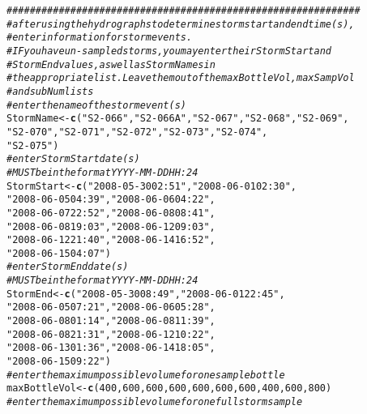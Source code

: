 \documentclass[a4paper,11pt]{article}\usepackage[]{graphicx}\usepackage[]{color}
\makeatletter
\newcommand{\hlnum}[1]{\textcolor[rgb]{0.686,0.059,0.569}{#1}}%
\newcommand{\hlstr}[1]{\textcolor[rgb]{0.192,0.494,0.8}{#1}}%
\newcommand{\hlcom}[1]{\textcolor[rgb]{0.678,0.584,0.686}{\textit{#1}}}%
\newcommand{\hlstd}[1]{\textcolor[rgb]{0.345,0.345,0.345}{#1}}%
\newcommand{\hlkwb}[1]{\textcolor[rgb]{0.69,0.353,0.396}{#1}}%
\newcommand{\hlkwd}[1]{\textcolor[rgb]{0.737,0.353,0.396}{\textbf{#1}}}%
\newenvironment{kframe}{%
 \def\at@end@of@kframe{}%
 \ifinner\ifhmode%
  \def\at@end@of@kframe{\end{minipage}}%
  \begin{minipage}{\columnwidth}%
 \fi\fi%
 \def\FrameCommand##1{\hskip\@totalleftmargin \hskip-\fboxsep
 \colorbox{shadecolor}{##1}\hskip-\fboxsep
     \hskip-\linewidth \hskip-\@totalleftmargin \hskip\columnwidth}%
 \MakeFramed {\advance\hsize-\width
   \@totalleftmargin\z@ \linewidth\hsize
   \@setminipage}}%
 {\par\unskip\endMakeFramed%
 \at@end@of@kframe}
\newenvironment{knitrout}{}{} %
\makeatother
\begin{document}
\begin{knitrout}
\color{fgcolor}\begin{kframe}
\begin{alltt}
\hlcom{#############################################################}
\hlcom{# after using the hydrographs to determine storm start and end time(s), }
\hlcom{# enter information for storm events.}
\hlcom{# IF you have un-sampled storms, you may enter their StormStart and  }
\hlcom{# StormEnd values, as well as StormNames in }
\hlcom{# the appropriate list. Leave them out of the maxBottleVol, maxSampVol  }
\hlcom{# and subNum lists}
\hlcom{# enter the name of the storm event(s)}
\hlstd{StormName} \hlkwb{<-} \hlkwd{c}\hlstd{(}\hlstr{"S2-066"}\hlstd{,}\hlstr{"S2-066A"}\hlstd{,}\hlstr{"S2-067"}\hlstd{,}\hlstr{"S2-068"}\hlstd{,}\hlstr{"S2-069"}\hlstd{,}
               \hlstr{"S2-070"}\hlstd{,}\hlstr{"S2-071"}\hlstd{,}\hlstr{"S2-072"}\hlstd{,}\hlstr{"S2-073"}\hlstd{,}\hlstr{"S2-074"}\hlstd{,}
               \hlstr{"S2-075"}\hlstd{)}
\hlcom{# enter Storm Start date(s)}
\hlcom{# MUST be in the format YYYY-MM-DD HH:24}
\hlstd{StormStart} \hlkwb{<-} \hlkwd{c}\hlstd{(}\hlstr{"2008-05-30 02:51"}\hlstd{,}\hlstr{"2008-06-01 02:30"}\hlstd{,}
                \hlstr{"2008-06-05 04:39"}\hlstd{,}\hlstr{"2008-06-06 04:22"}\hlstd{,}
                \hlstr{"2008-06-07 22:52"}\hlstd{,}\hlstr{"2008-06-08 08:41"}\hlstd{,}
                \hlstr{"2008-06-08 19:03"}\hlstd{,}\hlstr{"2008-06-12 09:03"}\hlstd{,}
                \hlstr{"2008-06-12 21:40"}\hlstd{,}\hlstr{"2008-06-14 16:52"}\hlstd{,}
                \hlstr{"2008-06-15 04:07"}\hlstd{)}
\hlcom{# enter Storm End date(s) }
\hlcom{# MUST be in the format YYYY-MM-DD HH:24}
\hlstd{StormEnd} \hlkwb{<-} \hlkwd{c}\hlstd{(}\hlstr{"2008-05-30 08:49"}\hlstd{,}\hlstr{"2008-06-01 22:45"}\hlstd{,}
              \hlstr{"2008-06-05 07:21"}\hlstd{,}\hlstr{"2008-06-06 05:28"}\hlstd{,}
              \hlstr{"2008-06-08 01:14"}\hlstd{,}\hlstr{"2008-06-08 11:39"}\hlstd{,}
              \hlstr{"2008-06-08 21:31"}\hlstd{,}\hlstr{"2008-06-12 10:22"}\hlstd{,}
              \hlstr{"2008-06-13 01:36"}\hlstd{,}\hlstr{"2008-06-14 18:05"}\hlstd{,}
              \hlstr{"2008-06-15 09:22"}\hlstd{)}
\hlcom{# enter the maximum possible volume for one sample bottle}
\hlstd{maxBottleVol} \hlkwb{<-} \hlkwd{c}\hlstd{(}\hlnum{400}\hlstd{,}\hlnum{600}\hlstd{,}\hlnum{600}\hlstd{,}\hlnum{600}\hlstd{,}\hlnum{600}\hlstd{,}\hlnum{600}\hlstd{,}\hlnum{600}\hlstd{,}\hlnum{400}\hlstd{,}\hlnum{600}\hlstd{,}\hlnum{800}\hlstd{)}
\hlcom{# enter the maximum possible volume for one full storm sample}

\end{alltt}
\end{kframe}
\end{knitrout}
\end{document}

